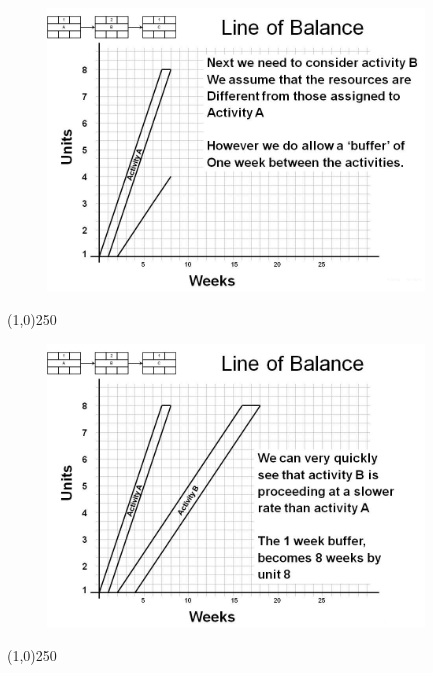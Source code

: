 \begin{frame}
\begin{figure}
	\centering
		\includegraphics[width = 10.0cm]{oldnotes/Slide247.jpg}
\end{figure}
\end{frame}
\begin{center}\line(1,0){250}\end{center}






\begin{frame}
\begin{figure}
	\centering
		\includegraphics[width = 10.0cm]{oldnotes/Slide248.jpg}
\end{figure}
\end{frame}
\begin{center}\line(1,0){250}\end{center}






